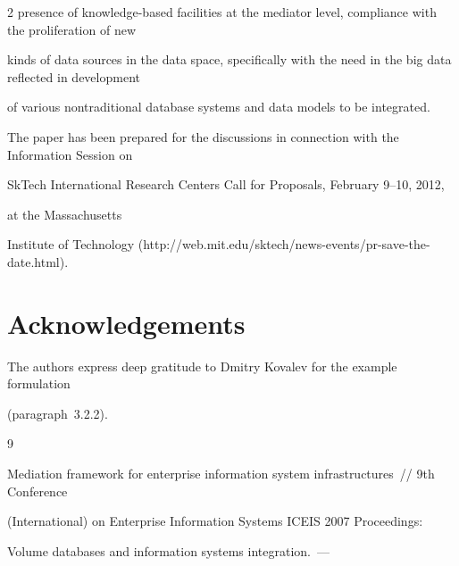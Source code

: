 \begin{multicols}{2}
presence of knowledge-based facilities at the mediator level, compliance with the proliferation of new 


kinds of data sources in the data space, specifically with the need in the big data reflected in development 


of various nontraditional database systems and data models to be integrated.





The paper has been prepared for the discussions in connection with the Information Session on 


SkTech International Research Centers Call for Proposals, February 9--10, 2012, 


at the Massachusetts 


Institute of Technology ({\sf http://web.mit.edu/sktech/news-events/pr-save-the-date.html}). 












\section*{Acknowledgements}


The authors express deep gratitude to Dmitry Kovalev for the example formulation 


(paragraph~3.2.2).


 


 {\small\frenchspacing


{%




\begin{thebibliography}{9}









Mediation framework for enterprise information system infrastructures~// 9th Conference 


(International) on Enterprise Information Systems ICEIS 2007 Proceedings:


Volume databases and information systems integration.~---



\end{thebibliography}}}
\end{multicols}
